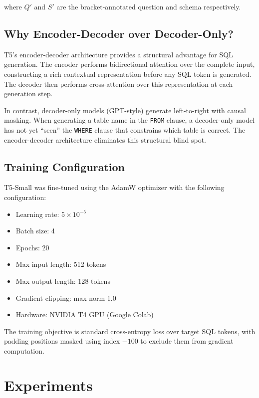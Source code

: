 \documentclass[conference]{IEEEtran}
\begin{document}
where $Q'$ and $S'$ are the bracket-annotated question and schema respectively.

\subsection{Why Encoder-Decoder over Decoder-Only?}

T5's encoder-decoder architecture provides a structural advantage for SQL generation. The encoder performs bidirectional attention over the complete input, constructing a rich contextual representation before any SQL token is generated. The decoder then performs cross-attention over this representation at each generation step.

In contrast, decoder-only models (GPT-style) generate left-to-right with causal masking. When generating a table name in the \texttt{FROM} clause, a decoder-only model has not yet ``seen'' the \texttt{WHERE} clause that constrains which table is correct. The encoder-decoder architecture eliminates this structural blind spot.

\subsection{Training Configuration}

T5-Small was fine-tuned using the AdamW optimizer \cite{loshchilov2019adamw} with the following configuration:

\begin{itemize}
    \item Learning rate: $5 \times 10^{-5}$
    \item Batch size: 4
    \item Epochs: 20
    \item Max input length: 512 tokens
    \item Max output length: 128 tokens
    \item Gradient clipping: max norm 1.0
    \item Hardware: NVIDIA T4 GPU (Google Colab)
\end{itemize}

The training objective is standard cross-entropy loss over target SQL tokens, with padding positions masked using index $-100$ to exclude them from gradient computation.

\section{Experiments}
\end{document}
